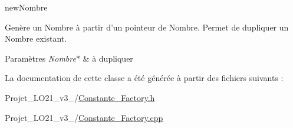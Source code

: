 new\-Nombre 

Genère un Nombre à partir d'un pointeur de Nombre. Permet de dupliquer un Nombre existant. 
\begin{DoxyParams}{Paramètres}
{\em Nombre$\ast$} & à dupliquer \\
\hline
\end{DoxyParams}


La documentation de cette classe a été générée à partir des fichiers suivants \-:\begin{DoxyCompactItemize}
\item 
Projet\-\_\-\-L\-O21\-\_\-v3\-\_/\hyperlink{_constante___factory_8h}{Constante\-\_\-\-Factory.\-h}\item 
Projet\-\_\-\-L\-O21\-\_\-v3\-\_/\hyperlink{_constante___factory_8cpp}{Constante\-\_\-\-Factory.\-cpp}\end{DoxyCompactItemize}
